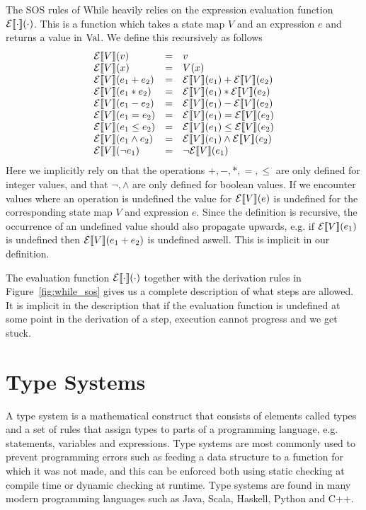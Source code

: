 The SOS rules of While heavily relies on the expression evaluation function
$\mathcal{E}\llbracket \cdot \rrbracket(\cdot)$. This is a function which takes a state map $V$ and an
expression $e$ and returns a value in $\mbox{$\mathrm{Val}$}$. We define this recursively as follows
\begin{equation*}
  \begin{array}{lll}
    \mathcal{E}\llbracket V \rrbracket(v) &=& v \\
    \mathcal{E}\llbracket V \rrbracket(x) &=& V(x) \\
    \mathcal{E}\llbracket V \rrbracket(e_1 + e_2) &=& \mathcal{E}\llbracket V \rrbracket(e_1) + \mathcal{E}\llbracket V \rrbracket(e_2) \\
    \mathcal{E}\llbracket V \rrbracket(e_1 * e_2) &=& \mathcal{E}\llbracket V \rrbracket(e_1) * \mathcal{E}\llbracket V \rrbracket(e_2) \\
    \mathcal{E}\llbracket V \rrbracket(e_1 - e_2) &=& \mathcal{E}\llbracket V \rrbracket(e_1) - \mathcal{E}\llbracket V \rrbracket(e_2) \\
    \mathcal{E}\llbracket V \rrbracket(e_1 = e_2) &=& \mathcal{E}\llbracket V \rrbracket(e_1) = \mathcal{E}\llbracket V \rrbracket(e_2) \\
    \mathcal{E}\llbracket V \rrbracket(e_1 \leq e_2) &=& \mathcal{E}\llbracket V \rrbracket(e_1) \leq \mathcal{E}\llbracket V \rrbracket(e_2) \\
    \mathcal{E}\llbracket V \rrbracket(e_1 \land e_2) &=& \mathcal{E}\llbracket V \rrbracket(e_1) \land \mathcal{E}\llbracket V \rrbracket(e_2) \\
    \mathcal{E}\llbracket V \rrbracket(\lnot e_1) &=& \lnot \mathcal{E}\llbracket V \rrbracket(e_1) \\
  \end{array}
\end{equation*}
Here we implicitly rely on that the operations $+, -, *, =, \leq$ are only
defined for integer values, and that $\lnot, \land$ are only defined for boolean
values.  If we encounter values where an operation is undefined the value for
$\mathcal{E}\llbracket V \rrbracket(e)$ is undefined for the corresponding state map $V$ and expression
$e$. Since the definition is recursive, the occurrence of an undefined value
should also propagate upwards, e.g. if $\mathcal{E}\llbracket V \rrbracket(e_1)$ is undefined
then $\mathcal{E}\llbracket V \rrbracket(e_1 + e_2)$ is undefined aswell. This is implicit in our
definition.

The evaluation function $\mathcal{E}\llbracket \cdot \rrbracket(\cdot)$ together with the derivation
rules in Figure~\ref{fig:while_sos} gives us a complete description of what
steps are allowed. It is implicit in the description that if the evaluation
function is undefined at some point in the derivation of a step, execution
cannot progress and we get stuck.

\section{Type Systems} \label{sec:type_systems}

A type system is a mathematical construct that consists of elements called types
and a set of rules that assign types to parts of a programming language, e.g.
statements, variables and expressions. Type systems are most commonly used to
prevent programming errors such as feeding a data structure to a function for
which it was not made, and this can be enforced both using static checking at
compile time or dynamic checking at runtime. Type systems are found in many
modern programming languages such as Java, Scala, Haskell, Python and C++.

